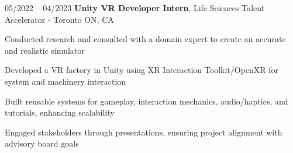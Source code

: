 \begin{twocolentry}{
    05/2022 – 04/2023
}
\fontsize{11 pt}{11 pt}\textbf{Unity VR Developer Intern}, Life Sciences Talent Accelerator - Toronto ON, CA\end{twocolentry}

\vspace{0.10 cm}
\begin{onecolentry}
    \begin{highlights}
        \item Conducted research and consulted with a domain expert to create an accurate and realistic simulator
        \item Developed a VR factory in Unity using XR Interaction Toolkit/OpenXR for system and machinery interaction
        \item Built reusable systems for gameplay, interaction mechanics, audio/haptics, and tutorials, enhancing scalability
        \item Engaged stakeholders through presentations, ensuring project alignment with advisory board goals
    \end{highlights}
\end{onecolentry}